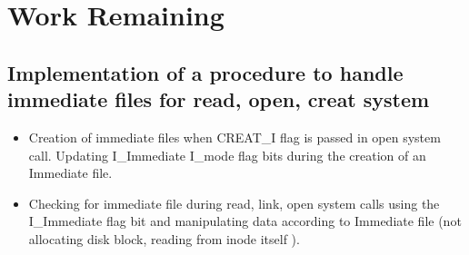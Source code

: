 \chapter{Work Remaining}

\section{Implementation of a procedure to handle immediate files for read, open, creat system}
\begin{itemize}
\item Creation of immediate files when CREAT\_I flag is passed in open system call. Updating I\_Immediate I\_mode flag bits during the creation of an Immediate file. 
\item Checking for immediate file during read, link, open system calls using the I\_Immediate flag bit and manipulating data according to Immediate file (not allocating disk block, reading from inode itself ).

\end{itemize}